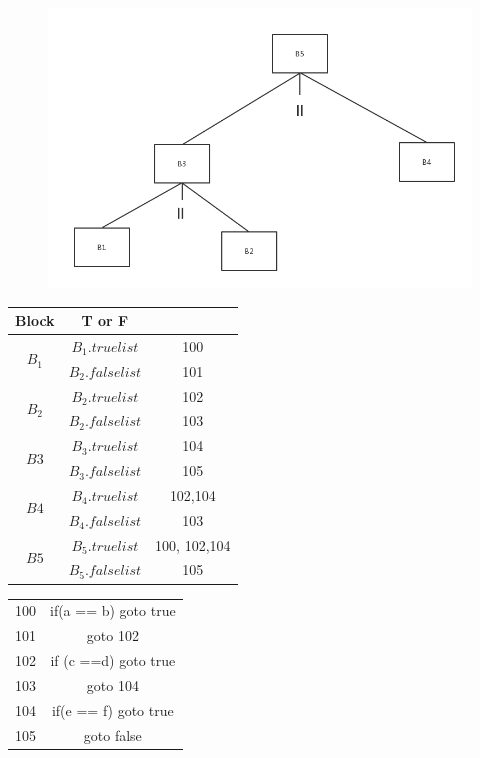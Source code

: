 \documentclass[a4paper, 16pt]{article}
\begin{document}
\begin{figure}[H]
\centering
\includegraphics[scale=0.3]{chapter6_hw3_2}
\end{figure}

\begin{table}[H]
\centering
\begin{tabular}{c|c|c}
\hline
\hline
Block & T or F & \\
\hline
\multirow{2}{*}{$B_1$} 
&$B_1.truelist$ & 100\\
&$B_2.falselist$ &101\\
\hline
\multirow{2}{*}{$B_2$} 
&$B_2.truelist$&102\\
&$B_2.falselist$ &103\\
\hline
\multirow{2}{*}{$B3$} 
&$B_3.truelist$ &104\\
&$B_3.falselist$&105\\
\hline
\multirow{2}{*}{$B4$} 
&$B_4.truelist$&102,104\\
&$B_4.falselist$&103\\
\hline
\multirow{2}{*}{$B5$} 
&$B_5.truelist$&100, 102,104\\
&$B_5.falselist$&105\\
\hline
\end{tabular}
\end{table}

\begin{table}[H]
\centering
\begin{tabular}{c c}
100 & if(a == b) goto true\\
101 & goto 102\\
102 &if (c ==d) goto true\\
103 &goto 104\\
104 & if(e == f) goto true\\
105 & goto false\\
\end{tabular}
\end{table}
\end{document}
